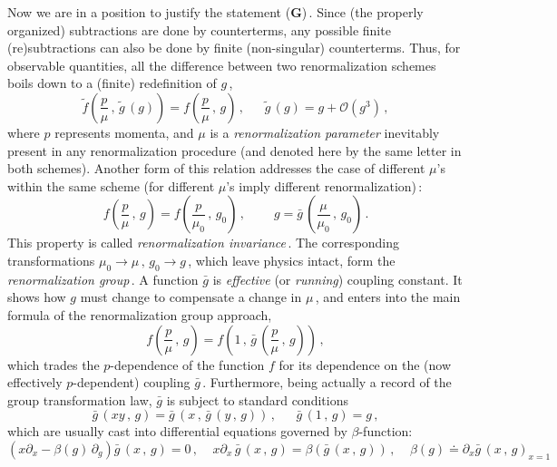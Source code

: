 \documentclass[a4paper,12pt]{article}
\begin{document}
Now we are in a position to justify the statement (\textbf{G})\,. Since (the
properly organized) subtractions are done by counterterms, any possible
finite (re)subtractions can also be done by finite (non-singular)
counterterms. Thus, for observable quantities, all the difference between
two renormalization schemes boils down to a (finite) redefinition of $g$\,,
\begin{equation}
\label{sch}
\tilde f(\frac{p}{\mu}\,,\,\tilde g\,(g)) = f(\frac{p}{\mu}\,,\,g)\,,
\ \ \ \ \ \ \ \tilde g\,(g) = g + \mathcal{O}(g^3)\,,
\end{equation}
where $p$ represents momenta, and $\mu$ is a \emph{renormalization parameter}
inevitably present in any renormalization procedure
(and denoted here by the same letter in both schemes). Another
form of this relation addresses the case of different $\mu$'s within the
same scheme (for different $\mu$'s imply different renormalization)\,:
\begin{equation}
\label{reninv}
f(\frac{p}{\mu}\,,\,g) = f(\frac{p}{\mu_0}\,,\,g_0)\,, \ \ \ \ \ \ \ \ \ \
g = \bar{g}\,(\frac{\mu}{\mu_0}\,,\,g_0)\,.
\end{equation}
This property is called \emph{renormalization invariance}\,. The
corresponding transformations $\mu_0\rightarrow\mu\,,\,g_0\rightarrow g$\,,
which leave physics intact, form the \emph{renormalization group}\,.
A function $\bar{g}$ is \emph{effective} (or \emph{running}) coupling
constant. It shows how $g$ must change to compensate a change in $\mu$\,,
and enters into the main formula of the renormalization group approach,
\begin{equation}
\label{RG}
f(\frac{p}{\mu}\,,\,g) = f(1\,,\,\bar{g}\,(\frac{p}{\mu}\,,\,g))\,,
\end{equation}
which trades the $p$-dependence of the function $f$ for its dependence
on the (now effectively $p$-dependent) coupling $\bar{g}$\,. Furthermore,
being actually a record of the group transformation law, $\bar{g}$
is subject to standard conditions
\begin{equation}
\label{group}
\bar{g}\,(xy\,,\,g) =  \bar{g}\,(x\,,\, \bar{g}\,(y\,,\,g))\,, \ \ \ \ \ \ \
\bar{g}\,(1\,,\,g) = g\,,
\end{equation}
which are usually cast into differential equations governed by
$\beta$-function:
\begin{equation}
\label{RGdiff}
(x\partial_x - \beta(g)\,\partial_g)\bar{g}\,(x\,,\,g) = 0\,, \ \ \ \ \
x\partial_x\,\bar{g}\,(x\,,\,g) = \beta(\bar{g}\,(x\,,\,g))\,, \ \ \ \ \
\beta(g)\doteq\partial_x\bar{g}\,(x\,,\,g)_{x=1}
\end{equation}
\end{document}
